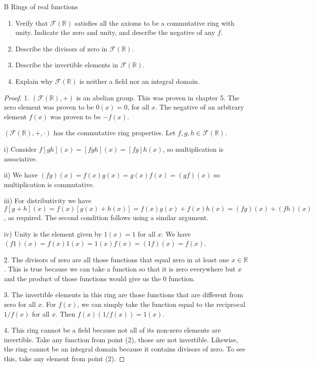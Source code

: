 \begin{exercise}{B Rings of real functions}
    \begin{enumerate}
        \item Verify that $\mathcal{F}(\mathbb{R})$ satisfies all the axioms to be a commutative ring with unity. Indicate the zero and unity, and describe the negative of any $f$.
        \item Describe the divisors of zero in $\mathcal{F}(\mathbb{R})$.
        \item Describe the invertible elements in $\mathcal{F}(\mathbb{R})$.
        \item Explain why $\mathcal{F}(\mathbb{R})$ is neither a field nor an integral domain.
    \end{enumerate}
\end{exercise}
\begin{proof}
 1. $(\mathcal{F}(\mathbb{R}),+)$ is an abelian group. This was proven in chapter 5. The zero element was proven to be $0(x)=0$, for all $x$. The negative of an arbitrary element $f(x)$ was proven to be $-f(x)$.

 $(\mathcal{F}(\mathbb{R}),+,\cdot)$ has the commutative ring properties. Let $f,g,h\in\mathcal{F}(\mathbb{R})$.

 i) Consider $f[gh](x)=[fgh](x)=[fg]h(x)$, so multiplication is associative.

 ii) We have $(fg)(x)=f(x)g(x)=g(x)f(x)=(gf)(x)$ so multiplication is commutative.

 iii) For distributivity we have $f[g+h](x)=f(x)[g(x)+h(x)]= f(x)g(x)+f(x)h(x)=(fg)(x)+(fh)(x)$, as required. The second condition follows using a similar argument.

 iv) Unity is the element given by $1(x)=1$ for all $x$. We have $(f1)(x)=f(x)1(x)=1(x)f(x)=(1f)(x)=f(x)$.

 2. The divisors of zero are all those functions that equal zero in at least one $x\in\mathbb{R}$. This is true because we can take a function so that it is zero everywhere but $x$ and the product of those functions would give us the 0 function.

 3. The invertible elements in this ring are those functions that are different from zero for all $x$. For $f(x)$, we can simply take the function equal to the reciprocal $1/f(x)$ for all $x$. Then $f(x)(1/f(x))=1(x)$.

 4. This ring cannot be a field because not all of its non-zero elements are invertible. Take any function from point (2), those are not invertible. Likewise, the ring cannot be an integral domain because it contains divisors of zero. To see this, take any element from point (2).
\end{proof}



